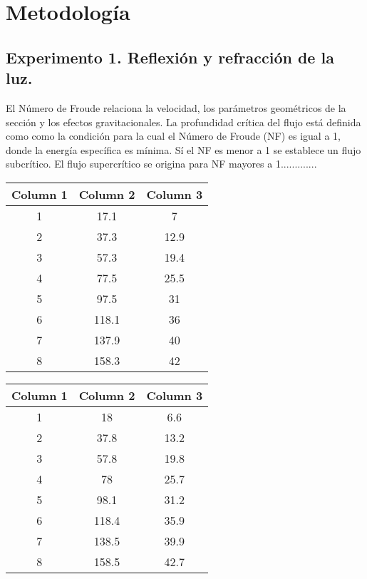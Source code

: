 \documentclass[10pt,journal]{IEEEtran}
\begin{document}
\section{Metodología}


\subsection{Experimento 1. Reflexión y refracción de la luz.}
El Número de Froude relaciona la velocidad, los parámetros geométricos de la sección y los efectos gravitacionales. La profundidad crítica del flujo está definida como como la condición para la cual el Número de Froude (NF) es igual a 1, donde la energía específica es mínima. Sí el NF es menor a 1 se establece un flujo subcrítico. El flujo supercrítico se origina para NF mayores a 1.............


\begin{center}
\begin{tabular}{|c|c|c|}
\hline
Column 1 & Column 2 & Column 3 \\
\hline
1 & 17.1 & 7 \\
\hline
2 & 37.3 & 12.9 \\
\hline
3 & 57.3 & 19.4 \\
\hline
4 & 77.5 & 25.5 \\
\hline
5 & 97.5 & 31 \\
\hline
6 & 118.1 & 36 \\
\hline
7 & 137.9 & 40 \\
\hline
8 & 158.3 & 42 \\
\hline
\end{tabular}
\end{center}

\begin{center}
\begin{tabular}{|c|c|c|}
\hline
Column 1 & Column 2 & Column 3 \\
\hline
1 & 18 & 6.6 \\
\hline
2 & 37.8 & 13.2 \\
\hline
3 & 57.8 & 19.8 \\
\hline
4 & 78 & 25.7 \\
\hline
5 & 98.1 & 31.2 \\
\hline
6 & 118.4 & 35.9 \\
\hline
7 & 138.5 & 39.9 \\
\hline
8 & 158.5 & 42.7 \\
\hline
\end{tabular}
\end{center}
\end{document}
